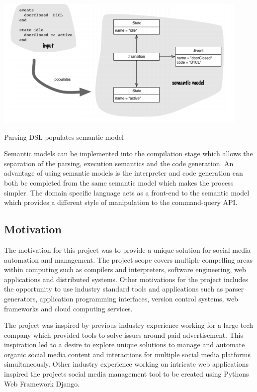 \documentclass[chapterprefix=false]{scrreprt}
\begin{document}
\begin{center}
 \includegraphics[scale=0.7]{dsl-semantic-model}
  \newline
  \caption{Parsing DSL populates semantic model \cite{DBLP:books/daglib/0034522}}
\end{center}

Semantic models can be implemented into the compilation stage which allows the separation of the parsing, execution semantics and the code generation. An advantage of using semantic models is the interpreter and code generation can both be completed from the same semantic model which makes the process simpler. The domain specific language acts as a front-end to the semantic model which provides a different style of manipulation to the command-query API\cite{DBLP:books/daglib/0034522}.

\subsection{Motivation}

The motivation for this project was to provide a unique solution for social media automation and management. The project scope covers multiple compelling areas within computing such as compilers and interpreters, software engineering, web applications and distributed systems. Other motivations for the project includes the opportunity to use industry standard tools and applications such as parser generators, application programming interfaces, version control systems, web frameworks and cloud computing services.

The project was inspired by previous industry experience working for a large tech company which provided tools to solve issues around paid advertisement. This inspiration led to a desire to explore unique solutions to manage and automate organic social media content and interactions for multiple social media platforms simultaneously. Other industry experience working on intricate web applications inspired the projects social media management tool to be created using Pythons Web Framework Django. 
\end{document}
